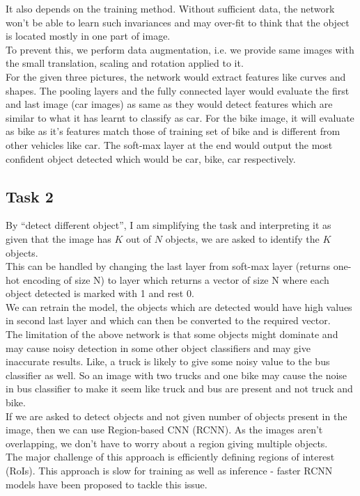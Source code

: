 \documentclass[12pt, fleqn]{article}
\begin{document}
It also depends on the training method. Without sufficient data, the network won't be able to learn such invariances and may over-fit to think that the object is located mostly in one part of image. \\
To prevent this, we perform data augmentation, i.e. we provide same images with the small translation, scaling and rotation applied to it. \\

For the given three pictures, the network would extract features like curves and shapes. The pooling layers and the fully connected layer would evaluate the first and last image (car images) as same as they would detect features which are similar to what it has learnt to classify as car. For the bike image, it will evaluate as bike as it's features match those of training set of bike and is different from other vehicles like car. The soft-max layer at the end would output the most confident object detected which would be car, bike, car respectively.


\newpage
\subsection{Task 2}
By ``detect different object'', I am simplifying the task and interpreting it as given that the image has $K$ out of $N$ objects, we are asked to identify the $K$ objects. \\
This can be handled by changing the last layer from soft-max layer (returns one-hot encoding of size N) to layer which returns a vector of size N where each object detected is marked with 1 and rest 0. \\
We can retrain the model, the objects which are detected would have high values in second last layer and which can then be converted to the required vector. \\
The limitation of the above network is that some objects might dominate and may cause noisy detection in some other object classifiers and may give inaccurate results. Like, a truck is likely to give some noisy value to the bus classifier as well. So an image with two trucks and one bike may cause the noise in bus classifier to make it seem like truck and bus are present and not truck and bike. \\

If we are asked to detect objects and not given number of objects present in the image, then we can use Region-based CNN (RCNN). As the images aren't overlapping, we don't have to worry about a region giving multiple objects. \\
The major challenge of this approach is efficiently defining regions of interest (RoIs). This approach is slow for training as well as inference - faster RCNN models have been proposed to tackle this issue. \\
\end{document}
